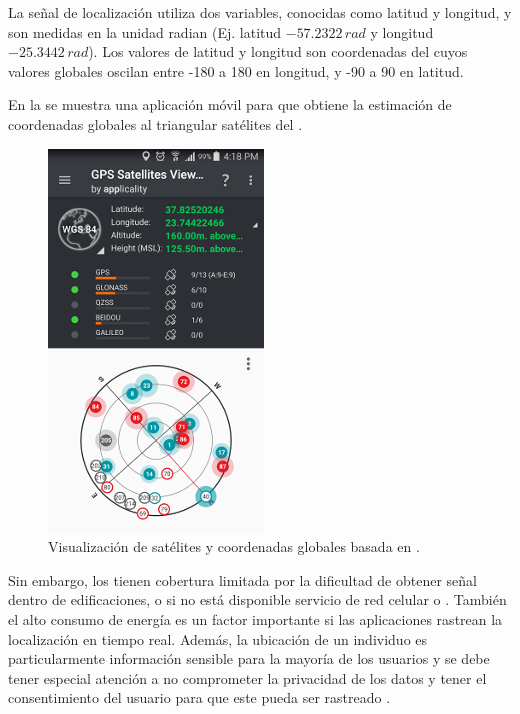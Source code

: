 La señal de localización utiliza dos variables, conocidas como latitud
y longitud, y son medidas en la unidad radian (Ej. latitud $-57.2322\,rad$
y longitud $-25.3442\,rad$). Los valores de latitud y longitud son
coordenadas del  cuyos valores globales oscilan entre -180
a 180 en longitud, y -90 a 90 en latitud.

En la  se muestra una aplicación móvil para 
que obtiene la estimación de coordenadas globales al triangular satélites
del . 

\begin{figure}[!tbph]
\begin{centering}
\includegraphics[scale=0.8]{capitulo-4/graphics/gps}
\par\end{centering}
\caption[Coordenadas por .]{\label{fig4:gps}Visualización de satélites y coordenadas globales
basada en .}
\end{figure}

Sin embargo, los  tienen cobertura limitada por la dificultad
de obtener señal dentro de edificaciones, o si no está disponible
servicio de red celular o . También el alto consumo de
energía es un factor importante si las aplicaciones rastrean la localización
en tiempo real. Además, la ubicación de un individuo es particularmente
información sensible para la mayoría de los usuarios y se debe tener
especial atención a no comprometer la privacidad de los datos y tener
el consentimiento del usuario para que este pueda ser rastreado \cite{LaraLabrador2013}.

